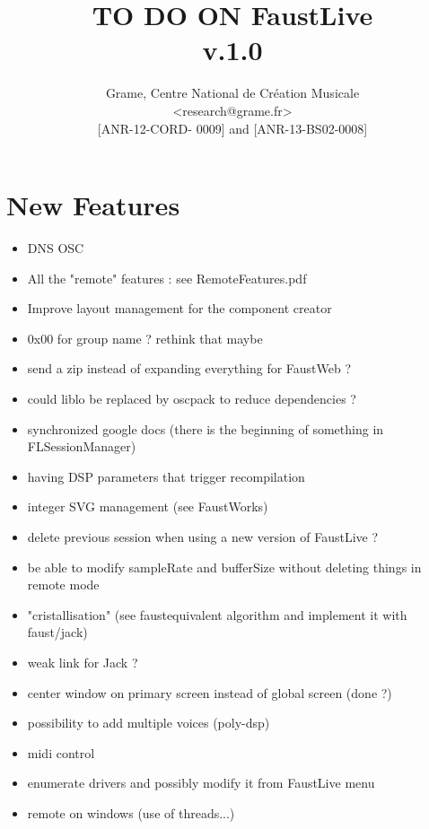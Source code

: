 \documentclass[a4paper]{article}
\begin{document}
\title{TO DO ON FaustLive \\ v.1.0}

\author{Grame, Centre National de Création Musicale\\
{\small <research@grame.fr>} \\
\vspace{2mm}
[ANR-12-CORD- 0009] and [ANR-13-BS02-0008]
}

\maketitle


\newpage
\section{New Features}

\begin{itemize}
\item DNS OSC 
\item All the "remote" features : see RemoteFeatures.pdf
\item Improve layout management for the component creator
\item 0x00 for group name ? rethink that maybe
\item send a zip instead of expanding everything for FaustWeb ?
\item could liblo be replaced by oscpack to reduce dependencies ?
\item synchronized google docs (there is the beginning of something in FLSessionManager)
\item having DSP parameters that trigger recompilation
\item integer SVG management (see FaustWorks)
\item delete previous session when using a new version of FaustLive ?
\item be able to modify sampleRate and bufferSize without deleting things in remote mode
\item "cristallisation" (see faustequivalent algorithm and implement it with faust/jack)
\item weak link for Jack ?
\item center window on primary screen instead of global screen (done ?)
\item possibility to add multiple voices (poly-dsp)
\item midi control 
\item enumerate drivers and possibly modify it from FaustLive menu
\item remote on windows (use of threads...)
\end{itemize}
\end{document}
